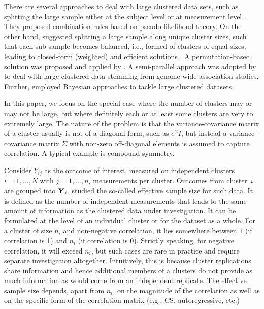 \documentclass[11pt,a5paper,twoside]{book}
\newcommand{\BY}{\mbox{\boldmath $Y$}}
\begin{document}
There are several approaches to deal with large clustered data sets, such as splitting the large sample either at the subject level or at measurement level \cite{Iddi2011}. They  proposed combination rules based on pseudo-likelihood theory. On the other hand, \cite{Lisa2016_2,Lisa2016_3} suggested splitting a large sample along unique cluster sizes, such that each sub-sample becomes balanced, i.e., formed of clusters of equal sizes, leading to closed-form (weighted) and efficient solutions \cite{Lisa2016_1}. A permutation-based solution was proposed and applied by \cite{milanzi2014}. A semi-parallel approach was adopted by \cite{sikorska2013,sikorska2013_2} to deal with large clustered data stemming from genome-wide association studies. Further, \cite{otava2014} employed Bayesian approaches to tackle large clustered datasets.

In this paper, we focus on the special case where the number of clusters may or may not be large, but where definitely each or at least some clusters are very to extremely large. The nature of the problem is that the variance-covariance matrix of a cluster usually is not of a diagonal form, such as  $\sigma^2 I$, but instead a variance-covariance matrix $\Sigma$ with non-zero off-diagonal elements is assumed to capture correlation. A typical example is compound-symmetry.
 
Consider $Y_{ij}$ as the outcome of interest, measured on independent clusters $i=1,\ldots,N$ with $j=1,\ldots,n_i$ measurements per cluster. Outcomes from cluster~$i$ are grouped into $\BY_i$. \cite{faes2009} studied the so-called {effective sample size\/} for such data. It is defined as the number of independent measurements that leads to the same amount of information as the clustered data under investigation. It can be formulated at the level of an individual cluster or for the dataset as a whole. For a cluster of size $n_i$ and non-negative correlation, it lies somewhere between $1$ (if correlation is 1) and $n_i$ (if correlation is 0). Strictly speaking, for negative correlation, it will exceed $n_i$, but such cases are rare in practice and require separate investigation altogether. Intuitively, this is because cluster replications share information and hence additional members of a clusters do not provide as much information as would come from an independent replicate. The effective sample size depends, apart from $n_i$, on the magnitude of the correlation as well as on the specific form of the correlation matrix (e.g., CS, autoregressive, etc.)
\end{document}

